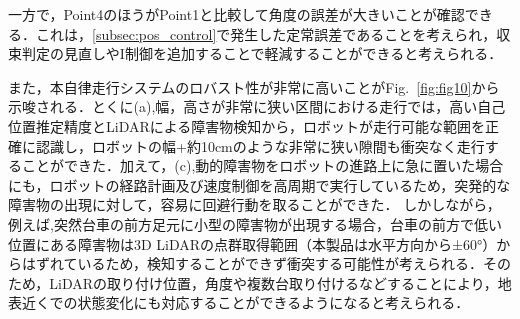 一方で，Point4のほうがPoint1と比較して角度の誤差が大きいことが確認できる．これは，\ref{subsec:pos_control}で発生した定常誤差であることを考えられ，収束判定の見直しやI制御を追加することで軽減することができると考えられる．

また，本自律走行システムのロバスト性が非常に高いことがFig.~\ref{fig:fig10}から示唆される．とくに(a),幅，高さが非常に狭い区間における走行では，高い自己位置推定精度とLiDARによる障害物検知から，ロボットが走行可能な範囲を正確に認識し，ロボットの幅+約10cmのような非常に狭い隙間も衝突なく走行することができた．加えて，(c),動的障害物をロボットの進路上に急に置いた場合にも，ロボットの経路計画及び速度制御を高周期で実行しているため，突発的な障害物の出現に対して，容易に回避行動を取ることができた．
しかしながら，例えば,突然台車の前方足元に小型の障害物が出現する場合，台車の前方で低い位置にある障害物は3D LiDARの点群取得範囲（本製品は水平方向から±60°）からはずれているため，検知することができず衝突する可能性が考えられる．そのため，LiDARの取り付け位置，角度や複数台取り付けるなどすることにより，地表近くでの状態変化にも対応することができるようになると考えられる．
